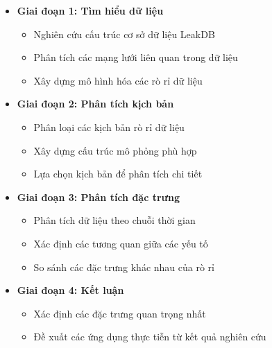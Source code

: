 \begin{itemize}
    \item \textbf{Giai đoạn 1: Tìm hiểu dữ liệu}
    \begin{itemize}
        \item Nghiên cứu cấu trúc cơ sở dữ liệu LeakDB 
        \item Phân tích các mạng lưới liên quan trong dữ liệu
        \item Xây dựng mô hình hóa các rò rỉ dữ liệu
    \end{itemize}
    
    \item \textbf{Giai đoạn 2: Phân tích kịch bản}
    \begin{itemize}
        \item Phân loại các kịch bản rò rỉ dữ liệu
        \item Xây dựng cấu trúc mô phỏng phù hợp
        \item Lựa chọn kịch bản để phân tích chi tiết
    \end{itemize}
    
    \item \textbf{Giai đoạn 3: Phân tích đặc trưng}
    \begin{itemize}
        \item Phân tích dữ liệu theo chuỗi thời gian
        \item Xác định các tương quan giữa các yếu tố
        \item So sánh các đặc trưng khác nhau của rò rỉ
    \end{itemize}
    
    \item \textbf{Giai đoạn 4: Kết luận}
    \begin{itemize}
        \item Xác định các đặc trưng quan trọng nhất
        \item Đề xuất các ứng dụng thực tiễn từ kết quả nghiên cứu
    \end{itemize}
\end{itemize}

